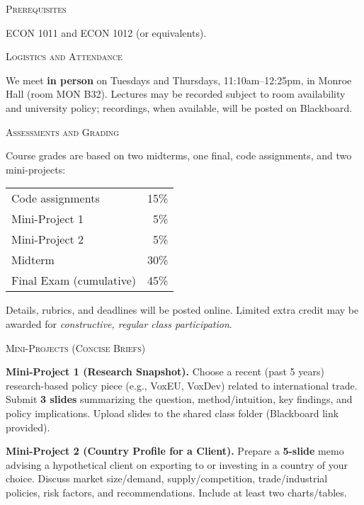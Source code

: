 \documentclass[11pt]{article}
\begin{document}
\bigskip

\noindent\textsc{Prerequisites}
\smallskip

ECON 1011 and ECON 1012 (or equivalents).

\bigskip

\noindent\textsc{Logistics and Attendance}

\smallskip
We meet \textbf{in person} on Tuesdays and Thursdays, 11:10am--12:25pm, in Monroe Hall (room  MON B32). Lectures may be recorded subject to room availability and university policy; recordings, when available, will be posted on Blackboard.

\bigskip

\noindent\textsc{Assessments and Grading}

\smallskip
Course grades are based on two midterms, one final, code assignments, and two mini-projects:

\medskip
\begin{tabular}{l r}
Code assignments & 15\% \\
Mini-Project 1 & 5\% \\
Mini-Project 2 & 5\% \\
Midterm & 30\% \\
Final Exam (cumulative) & 45\%
\end{tabular}

\medskip
\noindent Details, rubrics, and deadlines will be posted online. Limited extra credit may be awarded for \textit{constructive, regular class participation}.

\bigskip

\noindent\textsc{Mini-Projects (Concise Briefs)}

\smallskip
\textbf{Mini-Project 1 (Research Snapshot).} Choose a recent (past 5 years) research-based policy piece (e.g., VoxEU, VoxDev) related to international trade. Submit \textbf{3 slides} summarizing the question, method/intuition, key findings, and policy implications. Upload slides to the shared class folder (Blackboard link provided). 

\smallskip
\textbf{Mini-Project 2 (Country Profile for a Client).} Prepare a \textbf{5-slide} memo advising a hypothetical client on exporting to or investing in a country of your choice. Discuss market size/demand, supply/competition, trade/industrial policies, risk factors, and recommendations. Include at least two charts/tables.
\end{document}
